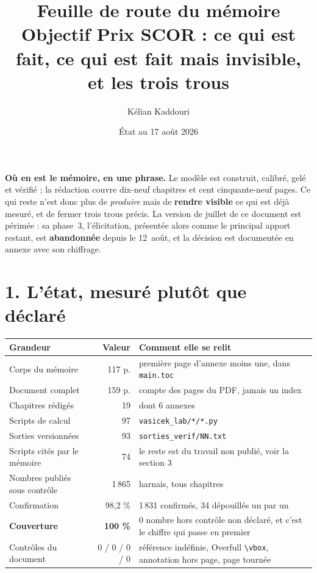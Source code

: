 \documentclass[11pt,a4paper]{article}
\title{\vspace{-1.4cm}\color{navy}\bfseries Feuille de route du mémoire\\[3pt]
  \large Objectif Prix SCOR : ce qui est fait, ce qui est fait mais invisible,
  et les trois trous}
\author{Kélian Kaddouri}
\date{État au 17 août 2026}
\begin{document}
\maketitle
\vspace{-0.8cm}

\begin{cle}
\textbf{Où en est le mémoire, en une phrase.} Le modèle est construit, calibré, gelé et
vérifié ; la rédaction couvre dix-neuf chapitres et cent cinquante-neuf pages. Ce qui reste
n'est donc plus de \emph{produire} mais de \textbf{rendre visible} ce qui est déjà mesuré, et de
fermer trois trous précis. La version de juillet de ce document est périmée : sa phase~3,
l'élicitation, présentée alors comme le principal apport restant, est \textbf{abandonnée} depuis
le 12~août, et la décision est documentée en annexe avec son chiffrage.
\end{cle}

\section*{1. L'état, mesuré plutôt que déclaré}

\begin{center}\footnotesize
\renewcommand{\arraystretch}{1.25}
\begin{tabular}{@{}p{5.4cm} r p{7.6cm}@{}}
\toprule
\textbf{Grandeur} & \textbf{Valeur} & \textbf{Comment elle se relit} \\
\midrule
Corps du mémoire & 117 p. & première page d'annexe moins une, dans \texttt{main.toc} \\
Document complet & 159 p. & compte des pages du PDF, jamais un index \\
Chapitres rédigés & 19 & dont 6 annexes \\
Scripts de calcul & 97 & \texttt{vasicek\_lab/*/*.py} \\
Sorties versionnées & 93 & \texttt{sorties\_verif/NN.txt} \\
Scripts cités par le mémoire & 74 & le reste est du travail non publié, voir la section 3 \\
Nombres publiés sous contrôle & 1\,865 & harnais, tous chapitres \\
Confirmation & 98,2 \% & 1\,831 confirmés, 34 dépouillés un par un \\
\textbf{Couverture} & \textbf{100 \%} & 0 nombre hors contrôle non déclaré, et c'est le
chiffre qui passe en premier \\
Contrôles du document & 0 / 0 / 0 / 0 & référence indéfinie, Overfull \verb|\vbox|,
annotation hors page, page tournée \\
\bottomrule
\end{tabular}
\end{center}
\end{document}
